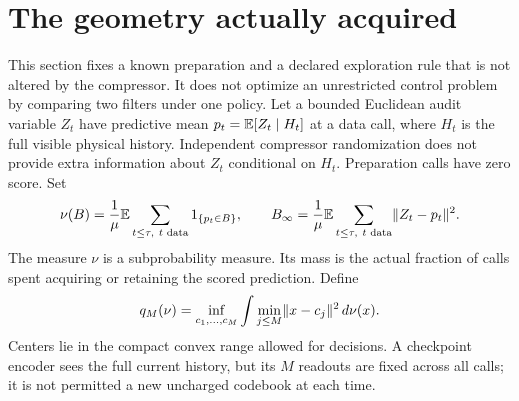 \section{The geometry actually acquired}\label{sec:geometry}
This section fixes a known preparation and a declared exploration rule that is not altered by the compressor. It does not optimize an unrestricted control problem by comparing two filters under one policy. Let a bounded Euclidean audit variable $Z_t$ have predictive mean $p_t=\mathbb E[Z_t\mid H_t]$ at a data call, where $H_t$ is the full visible physical history. Independent compressor randomization does not provide extra information about $Z_t$ conditional on $H_t$. Preparation calls have zero score. Set
\begin{equation}\label{eq:geometry-law}
 \nu(B)=\frac1\mu\mathbb E\sum_{t\le\tau,\ t\text{ data}}1_{\{p_t\in B\}},\qquad
 B_\infty=\frac1\mu\mathbb E\sum_{t\le\tau,\ t\text{ data}}
              \lVert Z_t-p_t\rVert^2.
\end{equation}
The measure $\nu$ is a subprobability measure. Its mass is the actual fraction of calls spent acquiring or retaining the scored prediction. Define
\begin{equation}\label{eq:quantization}
 q_M(\nu)=\inf_{c_1,\ldots,c_M}\int\min_{j\le M}\lVert x-c_j\rVert^2\,d\nu(x).
\end{equation}
Centers lie in the compact convex range allowed for decisions. A checkpoint encoder sees the full current history, but its $M$ readouts are fixed across all calls; it is not permitted a new uncharged codebook at each time.

